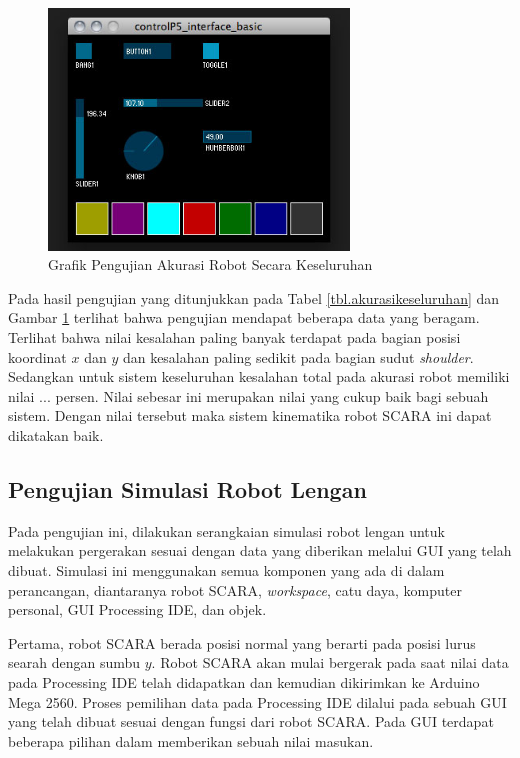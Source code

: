 \begin{figure}[H]
	\centering
	\includegraphics[width=8cm]{gambar/controlp5.jpg}
	\caption{Grafik Pengujian Akurasi Robot Secara Keseluruhan}
	\label{pic.akurasikeseluruhan}
\end{figure}

Pada hasil pengujian yang ditunjukkan pada Tabel \ref{tbl.akurasikeseluruhan} dan Gambar \ref{pic.akurasikeseluruhan} terlihat bahwa pengujian mendapat beberapa data yang beragam. Terlihat bahwa nilai kesalahan paling banyak terdapat pada bagian posisi koordinat $x$ dan $y$ dan kesalahan paling sedikit pada bagian sudut \textit{shoulder}. Sedangkan untuk sistem keseluruhan kesalahan total pada akurasi robot memiliki nilai ... persen. Nilai sebesar ini merupakan nilai yang cukup baik bagi sebuah sistem. Dengan nilai tersebut maka sistem kinematika robot SCARA ini dapat dikatakan baik. 
\subsection{Pengujian Simulasi Robot Lengan}
Pada pengujian ini, dilakukan serangkaian simulasi robot lengan untuk melakukan pergerakan sesuai dengan data yang diberikan melalui GUI yang telah dibuat. Simulasi ini menggunakan semua komponen yang ada di dalam perancangan, diantaranya robot SCARA, \textit{workspace}, catu daya, komputer personal, GUI Processing IDE, dan objek.

Pertama, robot SCARA berada posisi normal yang berarti pada posisi lurus searah dengan sumbu $y$. Robot SCARA akan mulai bergerak pada saat nilai data pada Processing IDE telah didapatkan dan kemudian dikirimkan ke Arduino Mega 2560. Proses pemilihan data pada Processing IDE dilalui pada sebuah GUI yang telah dibuat sesuai dengan fungsi dari robot SCARA. Pada GUI terdapat beberapa pilihan dalam memberikan sebuah nilai masukan. 

